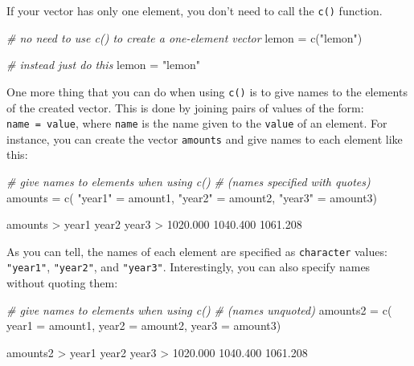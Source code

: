 \documentclass[
]{book}
\newenvironment{Shaded}{\begin{snugshade}}{\end{snugshade}}
\newcommand{\AttributeTok}[1]{\textcolor[rgb]{0.77,0.63,0.00}{#1}}
\newcommand{\CommentTok}[1]{\textcolor[rgb]{0.56,0.35,0.01}{\textit{#1}}}
\newcommand{\FloatTok}[1]{\textcolor[rgb]{0.00,0.00,0.81}{#1}}
\newcommand{\FunctionTok}[1]{\textcolor[rgb]{0.00,0.00,0.00}{#1}}
\newcommand{\NormalTok}[1]{#1}
\newcommand{\OtherTok}[1]{\textcolor[rgb]{0.56,0.35,0.01}{#1}}
\newcommand{\SpecialCharTok}[1]{\textcolor[rgb]{0.00,0.00,0.00}{#1}}
\newcommand{\StringTok}[1]{\textcolor[rgb]{0.31,0.60,0.02}{#1}}
\begin{document}
If your vector has only one element, you don't need to call the \texttt{c()} function.

\begin{Shaded}
\begin{Highlighting}[]
\CommentTok{\# no need to use c() to create a one{-}element vector}
\NormalTok{lemon }\OtherTok{=} \FunctionTok{c}\NormalTok{(}\StringTok{"lemon"}\NormalTok{)}

\CommentTok{\# instead just do this}
\NormalTok{lemon }\OtherTok{=} \StringTok{"lemon"}
\end{Highlighting}
\end{Shaded}

One more thing that you can do when using \texttt{c()} is to give names to the
elements of the created vector. This is done by joining pairs of
values of the form: \texttt{\textquotesingle{}name\textquotesingle{}\ =\ value}, where \texttt{\textquotesingle{}name\textquotesingle{}} is the name given to the
\texttt{value} of an element. For instance, you can create the vector
\texttt{amounts} and give names to each element like this:

\begin{Shaded}
\begin{Highlighting}[]
\CommentTok{\# give names to elements when using c()}
\CommentTok{\# (names specified with quotes)}
\NormalTok{amounts }\OtherTok{=} \FunctionTok{c}\NormalTok{(}
  \StringTok{"year1"} \OtherTok{=}\NormalTok{ amount1, }
  \StringTok{"year2"} \OtherTok{=}\NormalTok{ amount2, }
  \StringTok{"year3"} \OtherTok{=}\NormalTok{ amount3)}

\NormalTok{amounts}
\SpecialCharTok{\textgreater{}}\NormalTok{    year1    year2    year3 }
\SpecialCharTok{\textgreater{}} \FloatTok{1020.000} \FloatTok{1040.400} \FloatTok{1061.208}
\end{Highlighting}
\end{Shaded}

As you can tell, the names of each element are specified as \texttt{character} values:
\texttt{"year1"}, \texttt{"year2"}, and \texttt{"year3"}. Interestingly, you can also
specify names without quoting them:

\begin{Shaded}
\begin{Highlighting}[]
\CommentTok{\# give names to elements when using c()}
\CommentTok{\# (names unquoted)}
\NormalTok{amounts2 }\OtherTok{=} \FunctionTok{c}\NormalTok{(}
  \AttributeTok{year1 =}\NormalTok{ amount1, }
  \AttributeTok{year2 =}\NormalTok{ amount2, }
  \AttributeTok{year3 =}\NormalTok{ amount3)}

\NormalTok{amounts2}
\SpecialCharTok{\textgreater{}}\NormalTok{    year1    year2    year3 }
\SpecialCharTok{\textgreater{}} \FloatTok{1020.000} \FloatTok{1040.400} \FloatTok{1061.208}
\end{Highlighting}
\end{Shaded}
\end{document}
